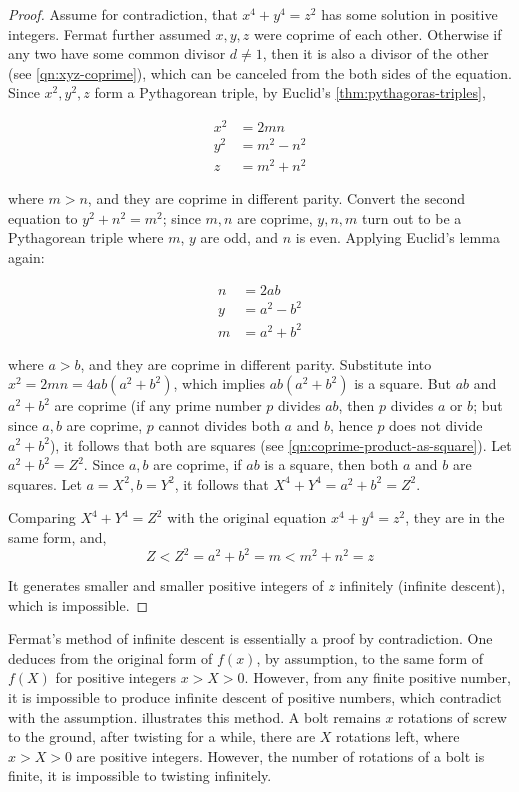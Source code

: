 \documentclass[b5paper]{article}
\begin{document}
\begin{proof}
Assume for contradiction, that $x^4 + y^4 = z^2$ has some solution in positive integers. Fermat further assumed $x, y, z$ were coprime of each other. Otherwise if any two have some common divisor $d \ne 1$, then it is also a divisor of the other (see \cref{qn:xyz-coprime}), which can be canceled from the both sides of the equation. Since $x^2, y^2, z$ form a Pythagorean triple, by Euclid's \cref{thm:pythagoras-triples},

\begin{align*}
x^2 &= 2mn \\
y^2 &= m^2 - n^2 \\
z &= m^2 + n^2
\end{align*}

where $m > n$, and they are coprime in different parity. Convert the second equation to $y^2 + n^2 = m^2$; since $m, n$ are coprime, $y, n, m$ turn out to be a Pythagorean triple where $m$, $y$ are odd, and $n$ is even. Applying Euclid's lemma again:

\begin{align*}
n &= 2ab \\
y &= a^2 - b^2 \\
m &= a^2 + b^2
\end{align*}

where $a > b$, and they are coprime in different parity. Substitute into $x^2 = 2mn = 4ab(a^2 + b^2)$, which implies $ab(a^2 + b^2)$ is a square. But $ab$ and $a^2 + b^2$ are coprime (if any prime number $p$ divides $ab$, then $p$ divides $a$ or $b$; but since $a, b$ are coprime, $p$ cannot divides both $a$ and $b$, hence $p$ does not divide $a^2 + b^2$), it follows that both are squares (see \cref{qn:coprime-product-as-square}). Let $a^2 + b^2 = Z^2$. Since $a, b$ are coprime, if $ab$ is a square, then both $a$ and $b$ are squares. Let $a = X^2, b= Y^2$, it follows that $X^4 + Y^4 = a^2 + b^2 = Z^2$.

Comparing $X^4 + Y^4 = Z^2$ with the original equation $x^4 + y^4 = z^2$, they are in the same form, and,
\[
Z < Z^2 = a^2 + b^2 = m < m^2 + n^2 = z
\]

It generates smaller and smaller positive integers of $z$ infinitely (infinite descent), which is impossible.
\end{proof}

Fermat's method of infinite descent is essentially a proof by contradiction. One deduces from the original form of $f(x)$, by assumption, to the same form of $f(X)$ for positive integers $x > X > 0$. However, from any finite positive number, it is impossible to produce infinite descent of positive numbers, which contradict with the assumption.  illustrates this method. A bolt remains $x$ rotations of screw to the ground, after twisting for a while, there are $X$ rotations left, where $x > X > 0$ are positive integers. However, the number of rotations of a bolt is finite, it is impossible to twisting infinitely.
\end{document}
